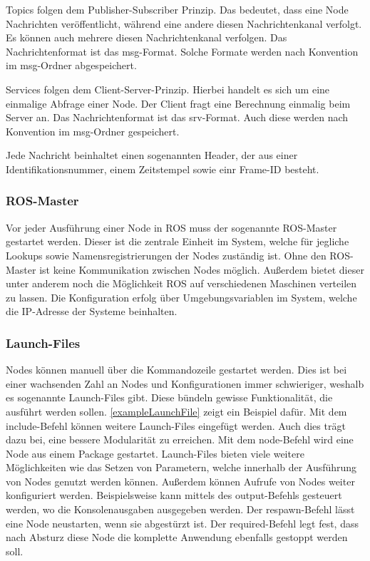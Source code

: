 Topics folgen dem Publisher-Subscriber Prinzip. Das bedeutet, dass eine Node Nachrichten veröffentlicht, während eine andere diesen Nachrichtenkanal verfolgt. Es können auch mehrere diesen Nachrichtenkanal verfolgen. Das Nachrichtenformat ist das msg-Format. Solche Formate werden nach Konvention im msg-Ordner abgespeichert.

Services folgen dem Client-Server-Prinzip. Hierbei handelt es sich um eine einmalige Abfrage einer Node. Der Client fragt eine Berechnung einmalig beim Server an.  Das Nachrichtenformat ist das srv-Format. Auch diese werden nach Konvention im msg-Ordner gespeichert.
    
Jede Nachricht beinhaltet einen sogenannten Header, der aus einer Identifikationsnummer, einem Zeitstempel sowie einr Frame-ID besteht.

\subsubsection{ROS-Master}

Vor jeder Ausführung einer Node in \ac{ROS} muss der sogenannte \ac{ROS}-Master gestartet werden. Dieser ist die zentrale Einheit im System, welche für jegliche Lookups sowie Namensregistrierungen der Nodes zuständig ist. Ohne den \ac{ROS}-Master ist keine Kommunikation zwischen Nodes möglich. Außerdem bietet dieser unter anderem noch die Möglichkeit \ac{ROS} auf verschiedenen Maschinen verteilen zu lassen. Die Konfiguration erfolg über Umgebungsvariablen im System, welche die IP-Adresse der Systeme beinhalten.

\subsubsection{Launch-Files}

Nodes können manuell über die Kommandozeile gestartet werden. Dies ist bei einer wachsenden Zahl an Nodes und Konfigurationen immer schwieriger, weshalb es sogenannte Launch-Files gibt. Diese bündeln gewisse Funktionalität, die ausführt werden sollen. \autoref{exampleLaunchFile} zeigt ein Beispiel dafür. Mit dem include-Befehl können weitere Launch-Files eingefügt werden. Auch dies trägt dazu bei, eine bessere Modularität zu erreichen. Mit dem node-Befehl wird eine Node aus einem Package gestartet. Launch-Files bieten viele weitere Möglichkeiten wie das Setzen von Parametern, welche innerhalb der Ausführung von Nodes genutzt werden können. Außerdem können Aufrufe von Nodes weiter konfiguriert werden. Beispielsweise kann mittels des output-Befehls gesteuert werden, wo die Konsolenausgaben ausgegeben werden. Der respawn-Befehl lässt eine Node neustarten, wenn sie abgestürzt ist. Der required-Befehl legt fest, dass nach Absturz diese Node die komplette Anwendung ebenfalls gestoppt werden soll.

